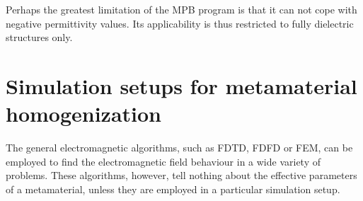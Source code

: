 Perhaps the greatest limitation of the MPB program is that it can not cope with negative permittivity values. Its applicability is thus restricted to fully dielectric structures only.	



\section{Simulation setups for metamaterial homogenization} %
The general electromagnetic algorithms,%
such as FDTD, FDFD or FEM, can be employed to find the electromagnetic field behaviour in a wide variety of problems. These algorithms, however, tell nothing about the effective parameters of a metamaterial, unless they are employed in a particular simulation setup. 

